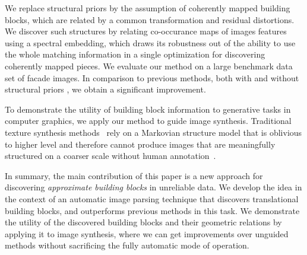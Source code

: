 \documentclass{acmtog}
\begin{document}
We replace structural priors by the assumption of coherently mapped building blocks, which are related by a common transformation and residual distortions. We discover such structures by relating co-occurance maps of images features using a spectral embedding, which draws its robustness out of the ability to use the whole  matching information in a single optimization for discovering coherently mapped pieces. We evaluate our method on a large benchmark data set of facade images. In comparison to previous methods, both with \cite{Wu2010DL} and without structural priors \cite{LIPMANsig2010,Liu2013GRASP}, we obtain a significant improvement.

To demonstrate the utility of building block information to generative tasks in computer graphics, we apply our method to guide image synthesis. Traditional texture synthesis methods~\cite{EfrosL99NP,Wei2000FT,Kwatra2003Graphcut,Kwatra2005TO} rely on a  Markovian structure model that is oblivious to higher level  and therefore cannot produce images that are meaningfully structured on a coarser scale without human annotation~\cite{Hertzmann2001IA}. 

In summary, the main contribution of this paper is a new approach for discovering \emph{approximate  building blocks} in unreliable data. We develop the idea in the context of an automatic image parsing technique that discovers translational building blocks, and outperforms previous methods in this task. We demonstrate the utility of the discovered building blocks and their geometric relations by applying it to image synthesis, where we can get improvements over unguided methods without sacrificing the fully automatic mode of operation.
\end{document}
